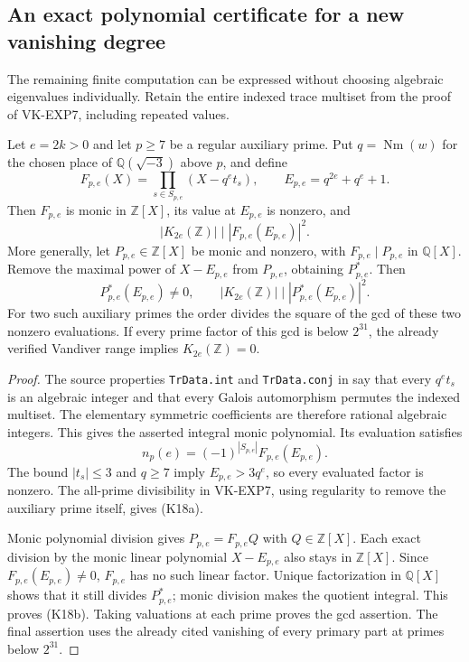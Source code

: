 \subsection{An exact polynomial certificate for a new vanishing degree}

The remaining finite computation can be expressed without choosing
algebraic eigenvalues individually. Retain the entire indexed trace
multiset from the proof of VK-EXP7, including repeated values.

\begin{proposition}
Let $e=2k>0$ and let $p\ge7$ be a regular auxiliary prime. Put
$q=\operatorname{Nm}(w)$ for the chosen place of
$\mathbb Q(\sqrt{-3})$ above $p$, and define
\[
 F_{p,e}(X)=\prod_{s\in S_{p,e}}(X-q^e t_s),\qquad
 E_{p,e}=q^{2e}+q^e+1.
\]
Then $F_{p,e}$ is monic in $\mathbb Z[X]$, its value at $E_{p,e}$
is nonzero, and
\[
 |K_{2e}(\mathbb Z)|\mid |F_{p,e}(E_{p,e})|^2.
 \tag{K18a}
\]
More generally, let $P_{p,e}\in\mathbb Z[X]$ be monic and nonzero,
with $F_{p,e}\mid P_{p,e}$ in $\mathbb Q[X]$. Remove the maximal
power of $X-E_{p,e}$ from $P_{p,e}$, obtaining $P^*_{p,e}$.
Then
\[
 P^*_{p,e}(E_{p,e})\ne0,\qquad
 |K_{2e}(\mathbb Z)|\mid |P^*_{p,e}(E_{p,e})|^2.
 \tag{K18b}
\]
For two such auxiliary primes the order divides the square of the
gcd of these two nonzero evaluations. If every prime factor of this
gcd is below $2^{31}$, the already verified Vandiver range implies
$K_{2e}(\mathbb Z)=0$.
\end{proposition}

\begin{proof}
The source properties \texttt{TrData.int} and
\texttt{TrData.conj} in  say that every
$q^e t_s$ is an algebraic integer and that every Galois automorphism
permutes the indexed multiset. The elementary symmetric
coefficients are therefore rational algebraic integers. This gives
the asserted integral monic polynomial. Its evaluation satisfies
\[
 n_p(e)=(-1)^{|S_{p,e}|}F_{p,e}(E_{p,e}).
\]
The bound $|t_s|\le3$ and $q\ge7$ imply
$E_{p,e}>3q^e$, so every evaluated factor is nonzero.
The all-prime divisibility in VK-EXP7, using regularity to remove
the auxiliary prime itself, gives (K18a).

Monic polynomial division gives $P_{p,e}=F_{p,e}Q$ with
$Q\in\mathbb Z[X]$. Each exact division by the monic linear
polynomial $X-E_{p,e}$ also stays in $\mathbb Z[X]$.
Since $F_{p,e}(E_{p,e})\ne0$, $F_{p,e}$ has no such linear
factor. Unique factorization in $\mathbb Q[X]$ shows that it still
divides $P^*_{p,e}$; monic division makes the quotient integral.
This proves (K18b). Taking valuations at each prime proves the
gcd assertion. The final assertion uses the already cited vanishing
of every primary part at primes below $2^{31}$.
\end{proof}

